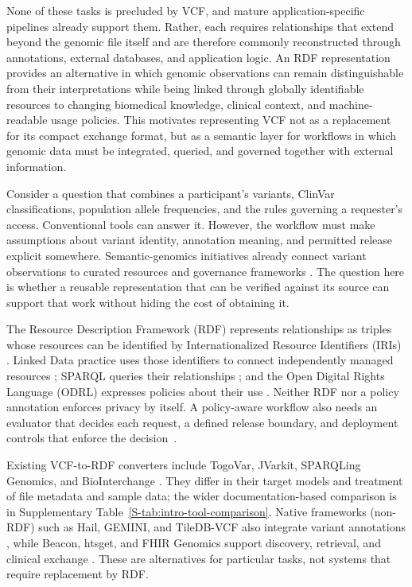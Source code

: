 \documentclass[pdflatex,sn-mathphys-num]{sn-jnl}
\begin{document}
None of these tasks is precluded by VCF, and mature application-specific pipelines already support them. 
Rather, each requires relationships that extend beyond the genomic file itself and are therefore commonly reconstructed through annotations, external databases, and application logic. 
An RDF representation provides an alternative in which genomic observations can remain distinguishable from their interpretations while being linked through globally identifiable resources to changing biomedical knowledge, clinical context, and machine-readable usage policies. 
This motivates representing VCF not as a replacement for its compact exchange format, but as a semantic layer for workflows in which genomic data must be integrated, queried, and governed together with external information.

Consider a question that combines a participant's variants, ClinVar~\cite{landrum2018clinvar} classifications, population allele frequencies, and the rules governing a requester's access. 
Conventional tools can answer it. 
However, the workflow must make assumptions about variant identity, annotation meaning, and permitted release explicit somewhere. 
Semantic-genomics initiatives already connect variant observations to curated resources and governance frameworks \cite{togovar_2022,sphn_semantic_2023}. 
The question here is whether a reusable representation that can be verified against its source can support that work without hiding the cost of obtaining it.

The Resource Description Framework (RDF) represents relationships as triples whose resources can be identified by Internationalized Resource Identifiers (IRIs) \cite{rdf,hogan_knowledge_graphs_2021}. 
Linked Data practice uses those identifiers to connect independently managed resources \cite{W3CLinkedDataWiki,bio2rdf_2008,openbiolink_2019,sib_2024}; SPARQL queries their relationships \cite{sparqllang}; and the Open Digital Rights Language (ODRL) expresses policies about their use \cite{odrl_2018}. 
Neither RDF nor a policy annotation enforces privacy by itself. 
A policy-aware workflow also needs an evaluator that decides each request, a defined release boundary, and deployment controls that enforce the decision~\cite{xacml3_2013}.

Existing VCF-to-RDF converters include TogoVar, JVarkit, SPARQLing Genomics, and BioInterchange \cite{togovar_2022,JVarkit_2015,sparqling_genomics_2020,sparqling_genomics_software,baran2015gfvo}. 
They differ in their target models and treatment of file metadata and sample data; the wider documentation-based comparison is in Supplementary Table~\ref{S-tab:intro-tool-comparison}. 
Native frameworks (non-RDF) such as Hail, GEMINI, and TileDB-VCF also integrate variant annotations \cite{hail_software,paila2013gemini,tiledb_vcf_software}, while Beacon, htsget, and FHIR Genomics support discovery, retrieval, and clinical exchange \cite{rambla2022beacon,kelleher2019htsget,fhir_genomics_ig}. 
These are alternatives for particular tasks, not systems that require replacement by RDF.
\end{document}
